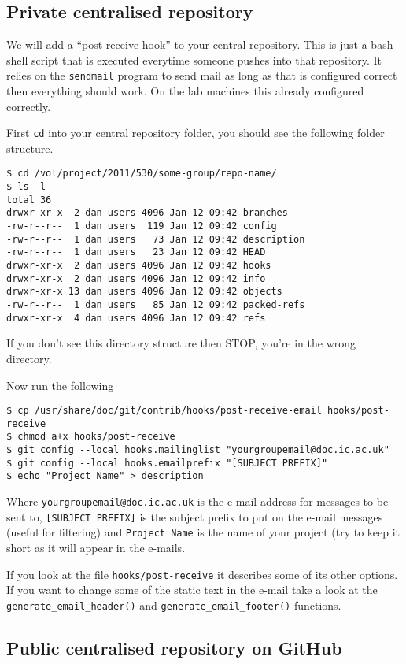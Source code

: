 \documentclass[a4paper,10pt,fleqn]{article}
\begin{document}
\subsection{Private centralised repository}
We will add a ``post-receive hook'' to your central repository. This is just a bash shell script that is executed everytime someone pushes into that repository. It relies on the \texttt{sendmail} program to send mail as long as that is configured correct then everything should work. On the lab machines this already configured correctly.

First \texttt{cd} into your central repository folder, you should see the following folder structure.
\begin{lstlisting}
$ cd /vol/project/2011/530/some-group/repo-name/
$ ls -l
total 36
drwxr-xr-x  2 dan users 4096 Jan 12 09:42 branches
-rw-r--r--  1 dan users  119 Jan 12 09:42 config
-rw-r--r--  1 dan users   73 Jan 12 09:42 description
-rw-r--r--  1 dan users   23 Jan 12 09:42 HEAD
drwxr-xr-x  2 dan users 4096 Jan 12 09:42 hooks
drwxr-xr-x  2 dan users 4096 Jan 12 09:42 info
drwxr-xr-x 13 dan users 4096 Jan 12 09:42 objects
-rw-r--r--  1 dan users   85 Jan 12 09:42 packed-refs
drwxr-xr-x  4 dan users 4096 Jan 12 09:42 refs
\end{lstlisting}
If you don't see this directory structure then STOP, you're in the wrong directory.

Now run the following
\begin{lstlisting}
$ cp /usr/share/doc/git/contrib/hooks/post-receive-email hooks/post-receive
$ chmod a+x hooks/post-receive
$ git config --local hooks.mailinglist "yourgroupemail@doc.ic.ac.uk"
$ git config --local hooks.emailprefix "[SUBJECT PREFIX]"
$ echo "Project Name" > description
\end{lstlisting}
Where \texttt{yourgroupemail@doc.ic.ac.uk} is the e-mail address for messages to be sent to, \texttt{[SUBJECT PREFIX]} is the subject prefix to put on the e-mail messages (useful for filtering) and \texttt{Project Name} is the name of your project (try to keep it short as it will appear in the e-mails.

If you look at the file \texttt{hooks/post-receive} it describes some of its other options. If you want to change some of the static text in the e-mail take a look at the \texttt{generate\_email\_header()} and \texttt{generate\_email\_footer()} functions.

\subsection{Public centralised repository on GitHub}
\end{document}

